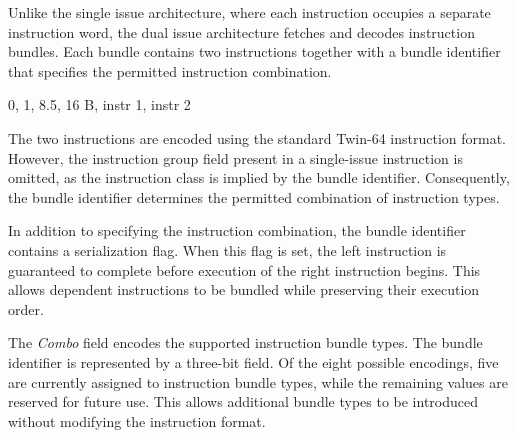 Unlike the single issue architecture, where each instruction occupies a separate instruction word, the dual issue architecture fetches and decodes instruction bundles. Each bundle contains two instructions together with a bundle identifier that specifies the permitted instruction combination.

\begin{center}
\drawInstrFormatSixtyFour
        {0, 1, 8.5, 16}
        {B, instr 1, instr 2 }
\end{center}

The two instructions are encoded using the standard Twin-64 instruction format. However, the instruction group field present in a single-issue instruction is omitted, as the instruction class is implied by the bundle identifier. Consequently, the bundle identifier determines the permitted combination of instruction types.

In addition to specifying the instruction combination, the bundle identifier contains a serialization flag. When this flag is set, the left instruction is guaranteed to complete before execution of the right instruction begins. This allows dependent instructions to be bundled while preserving their execution order.

\begin{figure}[H]
\begin{center}
\end{center}
\end{figure}

The \emph{Combo} field encodes the supported instruction bundle types. The bundle identifier is represented by a three-bit field. Of the eight possible encodings, five are currently assigned to instruction bundle types, while the remaining values are reserved for future use. This allows additional bundle types to be introduced without modifying the instruction format.

